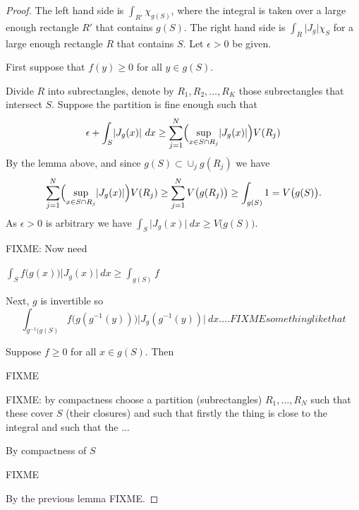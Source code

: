 \documentclass[12pt]{book}
\newcommand{\sabs}[1]{\lvert {#1} \rvert}
\theoremstyle{plain}
\theoremstyle{remark}
\theoremstyle{definition}
\theoremstyle{exercise}
\theoremstyle{example}
\begin{document}
\begin{proof}
The left hand side is $\int_{R'} \chi_{g(S)}$, where the integral is taken over a
large enough rectangle $R'$ that contains $g(S)$.
The right hand side is $\int_{R} \sabs{J_g} \chi_S$ for
a large enough rectangle $R$ that contains $S$.  Let $\epsilon > 0$ be
given.

First suppose that $f(y) \geq 0$ for all $y \in g(S)$.

Divide $R$ into
subrectangles, denote
by $R_1,R_2,\ldots,R_K$ those subrectangles that intersect $S$.
Suppose the partition is fine enough such that
\begin{equation*}
\epsilon + \int_S \sabs{J_g(x)} ~ dx \geq
\sum_{j=1}^N \Bigl(\sup_{x \in S \cap R_j} \sabs{J_g(x)} \Bigr) V(R_j)
\end{equation*}
By the lemma above, and since $g(S) \subset \cup_j g(R_j)$ we have
\begin{equation*}
\sum_{j=1}^N \Bigl(\sup_{x \in S \cap R_j} \sabs{J_g(x)} \Bigr) V(R_j)
\geq
\sum_{j=1}^N V\bigl(g(R_j)\bigr)
\geq \int_{g(S)} 1 = V\bigl(g(S)\bigr) .
\end{equation*}
As $\epsilon > 0$ is arbitrary we have
$\int_S \sabs{J_g(x)} ~ dx \geq V\bigl(g(S)\bigr)$.


FIXME: Now need

$\int_S f\bigl(g(x)\bigr) \sabs{J_g(x)} ~ dx \geq \int_{g(S)} f$


Next, $g$ is invertible
so
\begin{equation*}
\int_{g^{-1}(g(S)} f\bigl(g(g^{-1}(y))\bigr) \sabs{J_g(g^{-1}(y))} ~ dx
.... FIXME something like that
\end{equation*}

Suppose $f \geq 0$ for all $x \in g(S)$.  Then




FIXME


FIXME: by compactness choose a partition (subrectangles) $R_1,\ldots,R_N$ such that these cover $S$
(their closures) and such that firstly  the thing is close to the integral
and such that the ...


By compactness of $S$

FIXME

By the previous lemma FIXME.





\end{proof}
\end{document}
